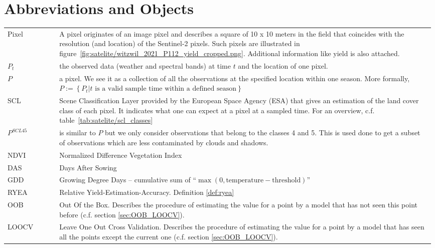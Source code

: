 \section*{Abbreviations and Objects}
\begin{longtable}{p{0.12\linewidth} p{0.87\linewidth}}
Pixel	
		& A pixel originates of an image pixel and describes a square of 10 x 10 meters in the field that coincides with the resolution (and location) of the Sentinel-2 pixels. Such pixels are illustrated in figure~\ref{fig:satelite/witzwil_2021_P112_yield_cropped.png}. Additional information like yield is also attached.\\

$P_t$	
		& the observed data (weather and spectral bands) at time $t$ and the location of one pixel. \\

$P$	
		& a pixel. We see it as a collection of all the observations at the specified location within one season. More formally, $P := \left\{P_t | t\text{ is a valid sample time within a defined season}\right\}$\\

SCL	
		& Scene Classification Layer provided by the European Space Agency (ESA) that gives an estimation of the land cover class of each pixel. It indicates what one can expect at a pixel at a sampled time. For an overview, c.f. table~\ref{tab:satelite/scl_classes}\\

$P^{SCL45}$	
		& is similar to $P$ but we only consider observations that belong to the classes 4 and 5. This is used done to get a subset of observations which are less contaminated by clouds and shadows.\\

NDVI	
		& Normalized Difference Vegetation Index \citep{rouseMonitoringVernalAdvancement1974}\\

DAS	
		& Days After Sowing\\

GDD	
		& Growing Degree Days -- cumulative sum of ``$\max(0, \text{temperature}-\text{threshold})$''\\

RYEA 	
		& Relative Yield-Estimation-Accuracy. Definition \ref{def:ryea}\\

OOB 	
		& Out Of the Box. Describes the procedure of  estimating the value for a point by a model that has not seen this point before (c.f. section \ref{sec:OOB_LOOCV}).\\

LOOCV 	
		& Leave One Out Cross Validation. Describes the procedure of estimating the value for a point by a model that has seen all the points except the current one (c.f. section \ref{sec:OOB_LOOCV}).\\
\end{longtable} 

